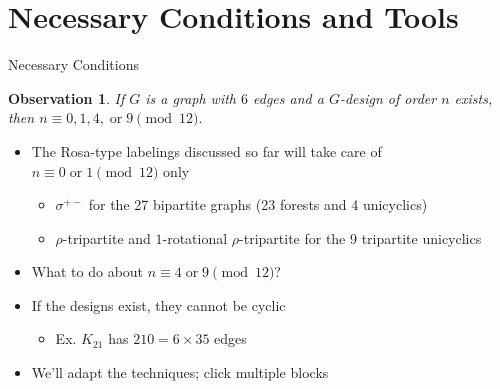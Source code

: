 \documentclass[11pt,serif,professionalfont,aspectratio=169]{beamer}
\theoremstyle{plain}
\newtheorem{observation}{Observation}
\begin{document}
\section{Necessary Conditions and Tools}
\begin{frame}{Necessary Conditions}
\begin{observation}
    If $G$ is a graph with $6$ edges and a $G$-design of order $n$ exists, then $n \equiv 0,1,4, \; \text{or} \;9 \pmod{12}.$
\end{observation}
    \pause
    \begin{itemize}
        \item The Rosa-type labelings discussed so far will take care of $n \equiv 0 \; \text{or} \; 1 \pmod{12}$ only
        \begin{itemize}
            \item $\sigma^{+-}$ for the 27 bipartite graphs (23 forests and 4 unicyclics)
            \item $\rho$-tripartite and $1$-rotational $\rho$-tripartite for the 9 tripartite unicyclics
        \end{itemize}
        \pause
        \item What to do about $n \equiv 4 \; \text{or} \; 9 \pmod{12}$?
        \pause
        \item If the designs exist, they cannot be cyclic
        \begin{itemize}
            \item Ex. $K_{21}$ has $210=6 \times 35$ edges
        \end{itemize}
        \pause
        \item We'll adapt the techniques; click multiple blocks
    \end{itemize}
\end{frame}
\end{document}
